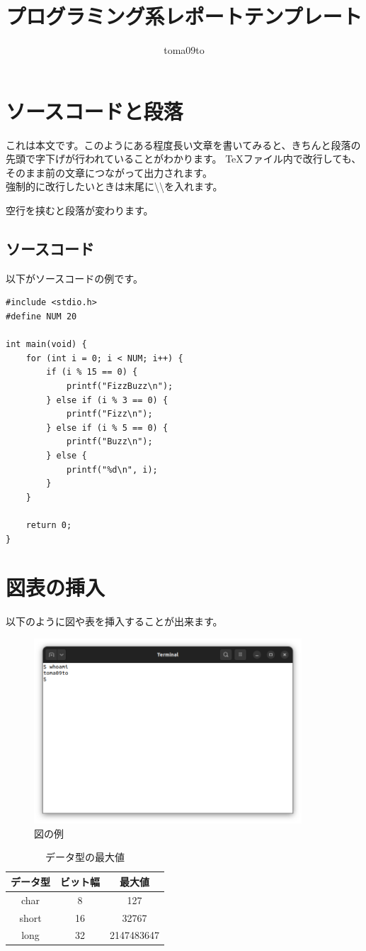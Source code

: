 \documentclass{ltjsarticle}
\title{プログラミング系レポートテンプレート}
\date{} %
\author{toma09to}
\begin{document}
\maketitle
\section{ソースコードと段落}
これは本文です。このようにある程度長い文章を書いてみると、きちんと段落の先頭で字下げが行われていることがわかります。
\TeX ファイル内で改行しても、そのまま前の文章につながって出力されます。 \\
強制的に改行したいときは末尾に\textbackslash\textbackslash を入れます。

空行を挟むと段落が変わります。
\subsection{ソースコード}
以下がソースコードの例です。
\begin{lstlisting}[language=myC,caption=FizzBuzz問題の1つの解法]
#include <stdio.h>
#define NUM 20

int main(void) {
    for (int i = 0; i < NUM; i++) {
        if (i % 15 == 0) {
            printf("FizzBuzz\n");
        } else if (i % 3 == 0) {
            printf("Fizz\n");
        } else if (i % 5 == 0) {
            printf("Buzz\n");
        } else {
            printf("%d\n", i);
        }
    }

    return 0;
}
\end{lstlisting}

\section{図表の挿入}
以下のように図や表を挿入することが出来ます。
\begin{figure}[H]
    \centering
    \includegraphics[width=100mm]{programming_template.png}
    \caption{図の例}
\end{figure}
\begin{table}[H]
    \centering
    \caption{データ型の最大値}
    \begin{tabular}{ c|c|c }
        データ型 & ビット幅 & 最大値 \\
        \hline
        char & 8 & 127 \\
        short & 16 & 32767 \\
        long & 32 & 2147483647 \\
    \end{tabular}
\end{table}
\end{document}
